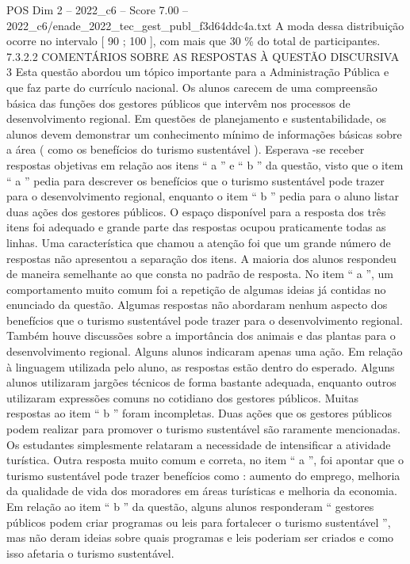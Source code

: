 \begin{textsample}{POS Dim 2 – 2022\_c6 – Score 7.00 – 2022\_c6/enade\_2022\_tec\_gest\_publ\_f3d64ddc4a.txt}
A moda dessa distribuição ocorre no intervalo [ 90 ; 100 ], com mais que 30 \% do total de participantes. 7.3.2.2 COMENTÁRIOS SOBRE AS RESPOSTAS À QUESTÃO DISCURSIVA 3 Esta questão abordou um tópico importante para a Administração Pública e que faz parte do currículo nacional.
Os alunos carecem de uma compreensão básica das funções dos gestores públicos que intervêm nos processos de desenvolvimento regional.
Em questões de planejamento e sustentabilidade, os alunos devem demonstrar um conhecimento mínimo de informações básicas sobre a área ( como os benefícios do turismo sustentável ).
Esperava -se receber respostas objetivas em relação aos itens “ a ” e “ b ” da questão, visto que o item “ a ” pedia para descrever os benefícios que o turismo sustentável pode trazer para o desenvolvimento regional, enquanto o item “ b ” pedia para o aluno listar duas ações dos gestores públicos.
O espaço disponível para a resposta dos três itens foi adequado e grande parte das respostas ocupou praticamente todas as linhas.
Uma característica que chamou a atenção foi que um grande número de respostas não apresentou a separação dos itens.
A maioria dos alunos respondeu de maneira semelhante ao que consta no padrão de resposta.
No item “ a ”, um comportamento muito comum foi a repetição de algumas ideias já contidas no enunciado da questão.
Algumas respostas não abordaram nenhum aspecto dos benefícios que o turismo sustentável pode trazer para o desenvolvimento regional.
Também houve discussões sobre a importância dos animais e das plantas para o desenvolvimento regional.
Alguns alunos indicaram apenas uma ação.
Em relação à linguagem utilizada pelo aluno, as respostas estão dentro do esperado.
Alguns alunos utilizaram jargões técnicos de forma bastante adequada, enquanto outros utilizaram expressões comuns no cotidiano dos gestores públicos.
Muitas respostas ao item “ b ” foram incompletas.
Duas ações que os gestores públicos podem realizar para promover o turismo sustentável são raramente mencionadas.
Os estudantes simplesmente relataram a necessidade de intensificar a atividade turística.
Outra resposta muito comum e correta, no item “ a ”, foi apontar que o turismo sustentável pode trazer benefícios como : aumento do emprego, melhoria da qualidade de vida dos moradores em áreas turísticas e melhoria da economia.
Em relação ao item “ b ” da questão, alguns alunos responderam “ gestores públicos podem criar programas ou leis para fortalecer o turismo sustentável ”, mas não deram ideias sobre quais programas e leis poderiam ser criados e como isso afetaria o turismo sustentável.

\end{textsample}
